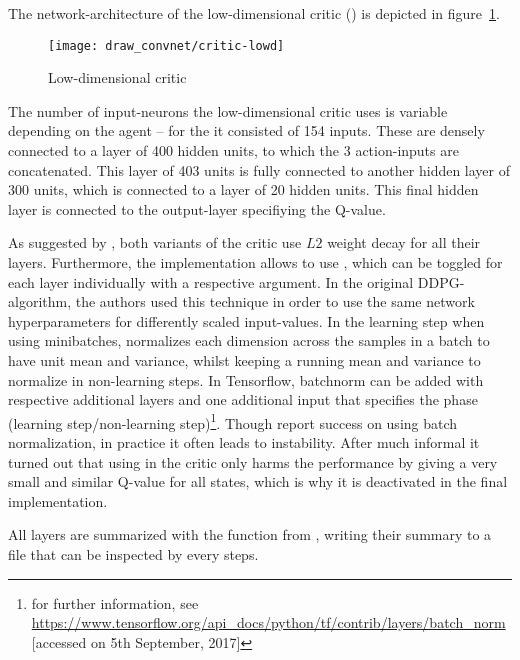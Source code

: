 \noindent The network-architecture of the low-dimensional critic () is depicted in figure~\ref{fig:lowdcrit}.

\begin{figure}[h]
	\centering 
	\texttt{[image: draw\_convnet/critic-lowd]}
	\caption{Low-dimensional critic}
	\label{fig:lowdcrit}
\end{figure}

The number of input-neurons the low-dimensional critic uses is variable depending on the agent -- for the  it consisted of 154 inputs. These are densely connected to a layer of 400 hidden units, to which the 3 action-inputs are concatenated. This layer of 403 units is fully connected to another hidden layer of 300 units, which is connected to a layer of 20 hidden units. This final hidden layer is connected to the output-layer specifiying the Q-value.

As suggested by \cite{lillicrap_continuous_2015}, both variants of the critic use $L2$ weight decay for all their layers. Furthermore, the implementation allows to use \cite{ioffe_batch_2015}, which can be toggled for each layer individually with a respective argument. In the original DDPG-algorithm, the authors used this technique in order to use the same network hyperparameters for differently scaled input-values. In the learning step when using minibatches, \batchnorm normalizes each dimension across the samples in a batch to have unit mean and variance, whilst keeping a running mean and variance to normalize in non-learning steps. In Tensorflow, batchnorm can be added with respective additional layers and one additional input that specifies the phase (learning step/non-learning step)\footnote{for further information, see \url{https://www.tensorflow.org/api\_docs/python/tf/contrib/layers/batch_norm} [accessed on 5th September, 2017]}. Though \cite{lillicrap_continuous_2015} report success on using batch normalization, in practice it often leads to instability. After much informal it turned out that using \batchnorm in the critic only harms the performance by giving a very small and similar Q-value for all states, which is why it is deactivated in the final implementation.

\noindent All layers are summarized with the function  from , writing their summary to a file that can be inspected by  every  steps. 


